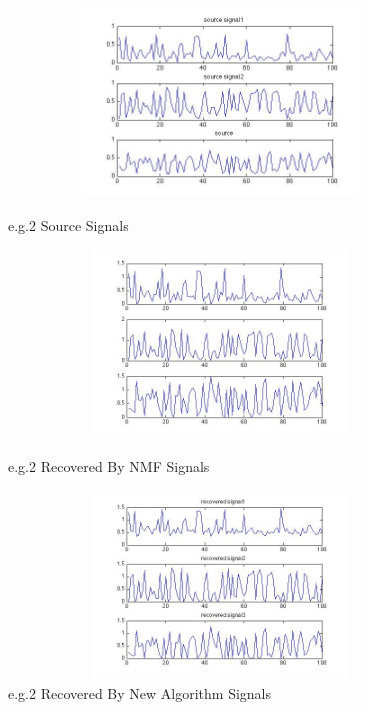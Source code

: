 \documentclass[14pt]{book}
\begin{document}
\begin{figure}[ht!]

\includegraphics[width=150mm,height = 50mm]{eg2s.jpg}
\caption{e.g.2 Source Signals}
\label{overflow}
\includegraphics[width=150mm,height = 50mm]{eg2NMF.jpg}
\caption{e.g.2 Recovered By NMF Signals}
\label{overflow}
\includegraphics[width=150mm,height = 50mm]{eg2new.jpg}
\caption{e.g.2 Recovered By New Algorithm Signals}
\label{overflow}
\end{figure}
\end{document}

